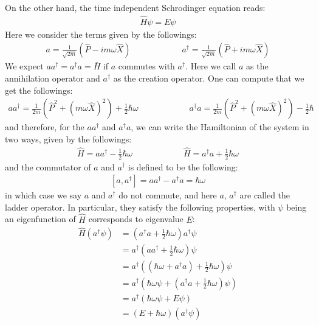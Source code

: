 \documentclass[11pt]{article}
\theoremstyle{break}
\theoremstyle{break}
\begin{document}
On the other hand, the time independent Schrodinger equation reads:
\begin{align*}
\hat{H}\psi = E \psi
\end{align*}
Here we consider the terms given by the followings:
\begin{align*}
a = \frac{1}{\sqrt{2m}}\left( \hat{P} - im \omega \hat{X}\right) \qquad\qquad\qquad a^\dagger = \frac{1}{\sqrt{
2m}}\left( \hat{P} + im \omega \hat{X}\right)
\end{align*}
We expect $aa^\dagger = a^{\dagger}a = \bar{H}$ if $a$ commutes with $a^{\dagger}$. Here we call $a$ as the annihilation operator and $a^{\dagger}$ as the creation operator. One can compute that we get the followings:
\begin{align*}
aa^{\dagger} = \frac{1}{2m}\left( \hat{P}^2 + (m\omega \hat{X})^2 \right) + \frac{1}{2}\hbar \omega \qquad\qquad\qquad a^{\dagger}a = \frac{1}{2m}\left( \hat{P}^2 + (m\omega \hat{X})^2 \right) - \frac{1}{2}\hbar
\end{align*}
and therefore, for the $aa^\dagger$ and $a^\dagger a$, we can write the Hamiltonian of the system in two ways, given by the followings:
\begin{align*}
\hat{H} = aa^{\dagger} - \frac{1}{2}\hbar \omega \qquad\qquad\qquad \hat{H} = a^{\dagger}a + \frac{1}{2}\hbar \omega
\end{align*}
and the commutator of $a$ and $a^{\dagger}$ is defined to be the following:
\begin{align*}
\left[ a, a^{\dagger}\right] = aa^{\dagger} - a^{\dagger}a = \hbar \omega
\end{align*}
in which case we say $a$ and $a^{\dagger}$ do not commute, and here $a$, $a^{\dagger}$ are called the ladder operator. In particular, they satisfy the following properties, with $\psi$ being an eigenfunction of $\hat{H}$ corresponds to eigenvalue $E$:
\begin{align*}
\hat{H}\left(a^{\dagger}\psi\right) &= \left( a^{\dagger}a + \frac{1}{2}\hbar\omega \right) a^{\dagger}\psi \\
&= a^\dagger\left( aa^{\dagger}+ \frac{1}{2}\hbar \omega \right) \psi\\
&=a^\dagger \left( (\hbar \omega + a^{\dagger}a) + \frac{1}{2}\hbar \omega \right) \psi\\
&= a^{\dagger}\left( \hbar \omega \psi + \left( a^{\dagger}a + \frac{1}{2}\hbar \omega \right) \psi\right) \\
&= a^{\dagger}\left( \hbar \omega \psi + E \psi\right)\\
&= (E+ \hbar \omega ) \left( a^{\dagger} \psi\right)
\end{align*}
\end{document}
